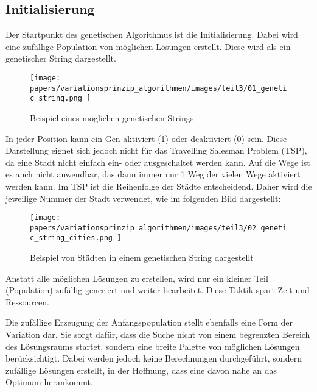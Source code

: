 %
%
%
%
\subsection{Initialisierung
\label{genetic_algorithm:initialization}}
Der Startpunkt des genetischen Algorithmus ist die Initialisierung.
Dabei wird eine zufällige Population von möglichen Lösungen erstellt.
Diese wird als ein genetischer String dargestellt.

\begin{figure} [h]
	\centering
	\texttt{[image: 
        papers/variationsprinzip\_algorithmen/images/teil3/01\_genetic\_string.png
        ]}
	\caption{Beispiel eines möglichen genetischen Strings}
	\label{fig:possible_genetic_string}
\end{figure}

In jeder Position kann ein Gen aktiviert (1) oder deaktiviert (0) sein.
Diese Darstellung eignet sich jedoch nicht für das Travelling Salesman 
Problem (TSP), da eine Stadt nicht einfach ein- oder ausgeschaltet werden kann.
Auf die Wege ist es auch nicht anwendbar, das dann immer nur 1 Weg der vielen Wege 
aktiviert werden kann. Im TSP ist die Reihenfolge der Städte entscheidend. 
Daher wird die jeweilige Nummer der Stadt verwendet, wie im folgenden Bild 
\cite{cities_genetic_string} dargestellt:

\begin{figure} [h]
	\centering
	\texttt{[image: 
        papers/variationsprinzip\_algorithmen/images/teil3/02\_genetic\_string\_cities.png
        ]}
	\caption{Beispiel von Städten in einem genetischen String dargestellt}
	\label{fig:cities_genetic_string}
\end{figure}

Anstatt alle möglichen Lösungen zu erstellen, wird nur ein kleiner Teil 
(Population) zufällig generiert und weiter bearbeitet. Diese Taktik 
spart Zeit und Ressourcen.

Die zufällige Erzeugung der Anfangspopulation stellt ebenfalls eine Form 
der Variation dar. Sie sorgt dafür, dass die Suche nicht von einem begrenzten 
Bereich des Lösungsraums startet, sondern eine breite Palette von möglichen 
Lösungen berücksichtigt. Dabei werden jedoch keine Berechnungen durchgeführt, 
sondern zufällige Lösungen erstellt, in der Hoffnung, dass eine davon nahe 
an das Optimum herankommt.

